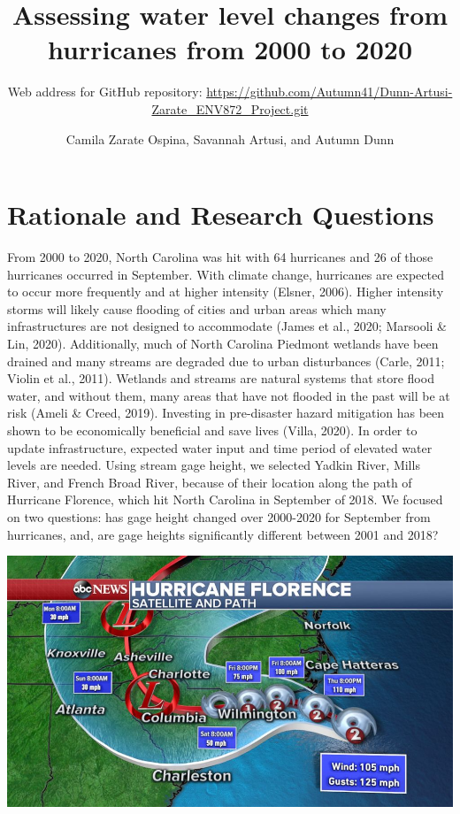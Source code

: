 \documentclass[
  12pt,
]{article}
\title{Assessing water level changes from hurricanes from 2000 to 2020}
\subtitle{Web address for GitHub repository:
\url{https://github.com/Autumn41/Dunn-Artusi-Zarate_ENV872_Project.git}}
\author{Camila Zarate Ospina, Savannah Artusi, and Autumn Dunn}
\date{}
\begin{document}
\maketitle

\newpage
\tableofcontents 
\newpage
\listoftables 
\newpage
\listoffigures 
\newpage

\hypertarget{rationale-and-research-questions}{%
\section{Rationale and Research
Questions}\label{rationale-and-research-questions}}

From 2000 to 2020, North Carolina was hit with 64 hurricanes and 26 of
those hurricanes occurred in September. With climate change, hurricanes
are expected to occur more frequently and at higher intensity (Elsner,
2006). Higher intensity storms will likely cause flooding of cities and
urban areas which many infrastructures are not designed to accommodate
(James et al., 2020; Marsooli \& Lin, 2020). Additionally, much of North
Carolina Piedmont wetlands have been drained and many streams are
degraded due to urban disturbances (Carle, 2011; Violin et al., 2011).
Wetlands and streams are natural systems that store flood water, and
without them, many areas that have not flooded in the past will be at
risk (Ameli \& Creed, 2019). Investing in pre-disaster hazard mitigation
has been shown to be economically beneficial and save lives (Villa,
2020). In order to update infrastructure, expected water input and time
period of elevated water levels are needed. Using stream gage height, we
selected Yadkin River, Mills River, and French Broad River, because of
their location along the path of Hurricane Florence, which hit North
Carolina in September of 2018. We focused on two questions: has gage
height changed over 2000-2020 for September from hurricanes, and, are
gage heights significantly different between 2001 and 2018?

\includegraphics{../Literature/HurricaneFlorencePathNC.png}
\end{document}
